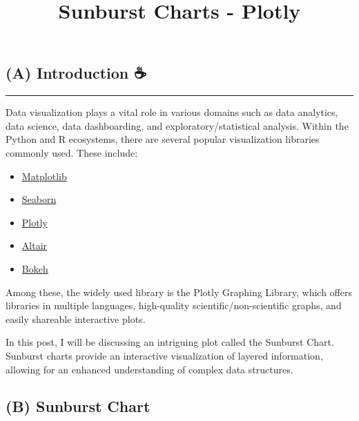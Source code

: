 \documentclass[
  letterpaper,
  DIV=11,
  numbers=noendperiod]{scrartcl}
\title{Sunburst Charts - Plotly}
\author{}
\date{}
\providecommand{\tightlist}{%
  \setlength{\itemsep}{0pt}\setlength{\parskip}{0pt}}\usepackage{longtable,booktabs,array}
\begin{document}
\maketitle
\ifdefined\Shaded\renewenvironment{Shaded}{\begin{tcolorbox}[frame hidden, interior hidden, boxrule=0pt, breakable, borderline west={3pt}{0pt}{shadecolor}, enhanced, sharp corners]}{\end{tcolorbox}}\fi

\hypertarget{a-introduction}{%
\subsection{(A) Introduction ☕️}\label{a-introduction}}

\begin{center}\rule{0.5\linewidth}{0.5pt}\end{center}

Data visualization plays a vital role in various domains such as data
analytics, data science, data dashboarding, and exploratory/statistical
analysis. Within the Python and R ecosystems, there are several popular
visualization libraries commonly used. These include:

\begin{itemize}
\tightlist
\item
  \href{https://matplotlib.org}{Matplotlib}
\item
  \href{https://seaborn.pydata.org}{Seaborn}
\item
  \href{https://plotly.com}{Plotly}
\item
  \href{https://altair-viz.github.io}{Altair}
\item
  \href{https://bokeh.org}{Bokeh}
\end{itemize}

Among these, the widely used library is the Plotly Graphing Library,
which offers libraries in multiple languages, high-quality
scientific/non-scientific graphs, and easily shareable interactive
plots.

In this post, I will be discussing an intriguing plot called the
Sunburst Chart. Sunburst charts provide an interactive visualization of
layered information, allowing for an enhanced understanding of complex
data structures.

\hypertarget{b-sunburst-chart}{%
\subsection{\texorpdfstring{(B) \textbf{Sunburst
Chart}}{(B) Sunburst Chart}}\label{b-sunburst-chart}}
\end{document}
